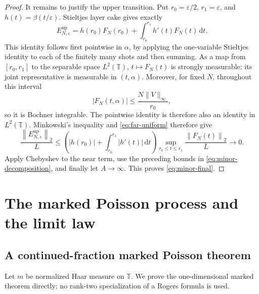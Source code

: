 \documentclass[11pt]{article}
\numberwithin{equation}{section}
\theoremstyle{definition}
\newcommand{\T}{\mathbb T}
\newcommand{\1}{\mathbf 1}
\newcommand{\dd}{\,\mathrm d}
\newcommand{\norm}[1]{\left\lVert#1\right\rVert}
\begin{document}
\begin{proof}
It remains to justify the upper transition.  Put
\(r_0=\varepsilon/2\), \(r_1=\varepsilon\), and
\(h(t)=\beta(t/\varepsilon)\).  Stieltjes layer cake gives exactly
\[
 E^{\mathrm{up}}_{N,\varepsilon}
 =h(r_0)F_N(r_0)+\int_{r_0}^{r_1}h'(t)F_N(t)\dd t.
\]
This identity follows first pointwise in \(\alpha\), by applying the
one-variable Stieltjes identity to each of the finitely many shots and
then summing.  As a map from \([r_0,r_1]\) to the separable space
\(L^2(\T)\), \(t\mapsto F_N(t)\) is strongly measurable: its joint
representative is measurable in \((t,\alpha)\).  Moreover, for fixed
\(N\), throughout this interval
\[
 |F_N(t,\alpha)|\le \frac{N\|V\|_\infty}{r_0},
\]
so it is Bochner integrable.  The pointwise identity is therefore also
an identity in \(L^2(\T)\).
Minkowski's inequality and \eqref{eq:far-uniform} therefore give
\[
 \frac{\norm{E^{\mathrm{up}}_{N,\varepsilon}}_2}{L}
 \le
 \left(|h(r_0)|+\int_{r_0}^{r_1}|h'(t)|\dd t\right)
 \sup_{r_0\le t\le r_1}\frac{\norm{F_N(t)}_2}{L}
 \longrightarrow0.
\]
Apply Chebyshev to the near term, use the preceding bounds in
\eqref{eq:minor-decomposition}, and finally let \(A\to\infty\).
This proves \eqref{eq:minor-final}.
\end{proof}

\section{The marked Poisson process and the limit law}\label{sec:poisson}

\subsection{A continued-fraction marked Poisson theorem}

Let \(m\) be normalized Haar measure on \(\T\).  We prove the
one-dimensional marked theorem directly; no rank-two specialization of a
Rogers formula is used.
\end{document}
